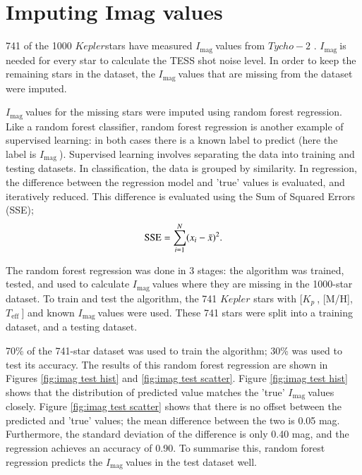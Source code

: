 \documentclass[a4paper,fleqn,usenatbib,useAMS]{mnras}
\newcommand{\teff}{\ensuremath{T_{\textrm{eff}}\:}}
\newcommand{\kep}{\ensuremath{Kepler}\:}
\newcommand{\kp}{\ensuremath{K_{p}\:}}
\newcommand{\imag}{\ensuremath{I_{\textrm{mag}}\:}}
\begin{document}
\section{Imputing Imag values}
\label{sect: impute}

741 of the 1000 \kep stars have measured \imag values from $Tycho-2$ \citep{hog_tycho-2_2000}. \imag is needed for every star to calculate the TESS shot noise level. In order to keep the remaining stars in the dataset, the \imag values that are missing from the dataset were imputed.

\imag values for the missing stars were imputed using random forest regression. Like a random forest classifier, random forest regression is another example of supervised learning: in both cases there is a known label to predict (here the label is \imag). Supervised learning involves separating the data into training and testing datasets. In classification, the data is grouped by similarity. In regression, the difference between the regression model and 'true' values is evaluated, and iteratively reduced. This difference is evaluated using the Sum of Squared Errors (SSE);
\begin{equation}
{\rm SSE} = \sum_{i=1}^{N} (x_{i} - \bar{x})^{2}.
\end{equation}

The random forest regression was done in 3 stages: the algorithm was trained, tested, and used to calculate \imag values where they are missing in the 1000-star dataset. To train and test the algorithm, the 741 $Kepler$ stars with [\kp, [M/H], \teff] and known \imag values were used. These 741 stars were split into a training dataset, and a testing dataset.

70\% of the 741-star dataset was used to train the algorithm; 30\% was used to test its accuracy. The results of this random forest regression are shown in Figures \ref{fig:imag test hist} and \ref{fig:imag test scatter}. Figure \ref{fig:imag test hist} shows that the distribution of predicted value matches the 'true' \imag values closely. Figure \ref{fig:imag test scatter} shows that there is no offset between the predicted and 'true' values; the mean difference between the two is 0.05 mag. Furthermore, the standard deviation of the difference is only 0.40 mag, and the regression achieves an accuracy of 0.90. To summarise this, random forest regression predicts the \imag values in the test dataset well.
\end{document}
